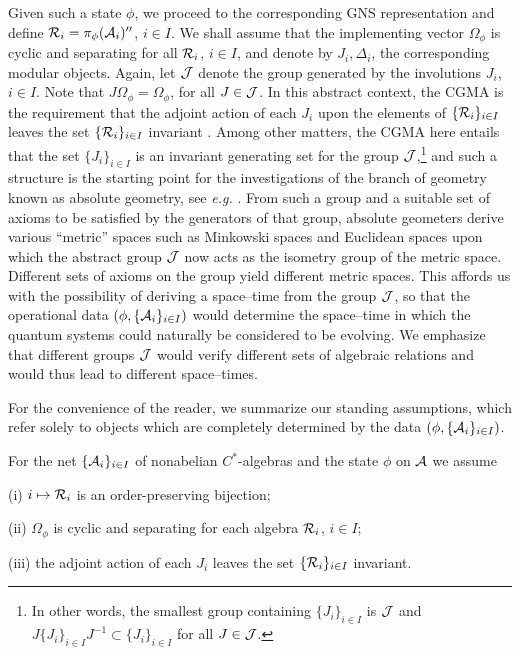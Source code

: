 \documentclass[12pt]{article}
\def\nind{\noindent}
\def\inet{{\{\As_i\}_{i \in I}}}
\def\irnet{{\{\Rs_i\}_{i \in I}}}
\def\As{{\cal A}}
\def\Js{{\cal J}}
\def\Rs{{\cal R}}
\def\nind{\noindent}
\begin{document}
     Given such a state $\phi$, we proceed to the corresponding
GNS representation and define $\Rs_i = \pi_\phi(\As_i)''$,
$i \in I$. We shall assume that the implementing vector $\Omega_\phi$
is cyclic and separating for all $\Rs_i$, $i \in I$, and denote
by $J_i, \Delta_i$, the corresponding modular objects. Again, let
$\Js$ denote the group generated by the involutions $J_i$, $i \in I$.
Note that $J \Omega_\phi = \Omega_\phi$, for all $J \in \Js$.
In this abstract context, the CGMA is the requirement that the
adjoint action of each $J_i$ upon the elements of $\irnet$ leaves
the set $\irnet$ invariant \cite{BDFS}. Among other matters, the
CGMA here entails that the set $\{ J_i \}_{i \in I}$ is an invariant
generating set for the group $\Js$,\footnote{In other words, 
the smallest group containing $\{ J_i \}_{i \in I}$ is $\Js$ and
$J \{ J_i \}_{i \in I} J^{-1} \subset \{ J_i \}_{i \in I}$ for all
$J \in \Js$.} and such a structure is the starting point
for the investigations of the branch of geometry known as
absolute geometry, see {\it e.g.} \cite{Ah,Ba,BBPW}. From such a group
and a suitable set of axioms to be satisfied by the generators of that
group, absolute geometers derive various ``metric'' spaces such as
Minkowski spaces and Euclidean spaces upon which the abstract group $\Js$
now acts as the isometry group of the metric space. Different sets of
axioms on the group yield different metric spaces. This affords us with
the possibility of deriving a space--time from the group $\Js$, 
so that the operational data $(\phi,\inet)$ 
would determine the space--time in which the quantum systems could 
naturally be considered to be evolving. We emphasize that 
different groups $\Js$ would verify different 
sets of algebraic relations and would thus lead to different 
space--times.
 
     For the convenience of the reader, we summarize our standing 
assumptions, which refer solely to objects which are completely
determined by the data $(\phi,\inet)$. 

\medskip

\nind{\bf Standing Assumptions} For the net $\inet$ of nonabelian 
$C^*$-algebras and the state $\phi$ on $\As$ we assume \par
   (i) $i \mapsto \Rs_i$ is an order-preserving bijection; \par
   (ii) $\Omega_\phi$ is cyclic and separating for each algebra 
$\Rs_i$, $i \in I$; \par
   (iii) the adjoint action of each $J_i$ leaves the set $\irnet$ invariant.
\end{document}
